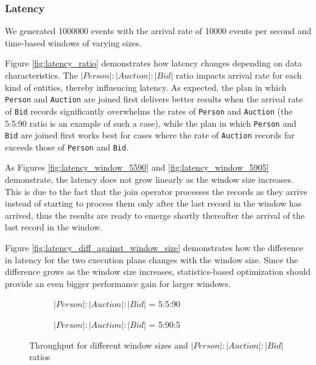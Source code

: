 \subsubsection{Latency}

We generated 1000000 events with the arrival rate of 10000 events per second and time-based windows of varying sizes.

Figure \ref{fig:latency_ratio} 
demonstrates how latency changes depending on data characteristics. The $|Person|:|Auction|:|Bid|$ ratio impacts arrival rate for each kind of entities, thereby influencing latency. As expected, the plan in which \texttt{Person} and \texttt{Auction} are joined first delivers better results when the arrival rate of \texttt{Bid} records significantly overwhelms the rates of \texttt{Person} and \texttt{Auction} (the 5:5:90 ratio is an example of such a case), while the plan in which \texttt{Person} and \texttt{Bid} are joined first works best for cases where the rate of \texttt{Auction} records far exceeds those of \texttt{Person} and \texttt{Bid}. 

As Figures \ref{fig:latency_window_5590} and \ref{fig:latency_window_5905} demonstrate, the latency does not grow linearly as the window size increases. This is due to the fact that the join operator processes the records as they arrive instead of starting to process them only after the last record in the window has arrived, thus the results are ready to emerge shortly thereafter the arrival of the last record in the window.

Figure \ref{fig:latency_diff_against_window_size} demonstrates how the difference in latency for the two execution plans changes with the window size. Since the difference grows as the window size increases, statistics-based optimization should provide an even bigger performance gain for larger windows.

\begin{figure}[!ht]
    \centering
    \begin{subfigure}[b]{0.45\textwidth}
            
            \captionsetup{justification=justified}
            \caption{$|Person|:|Auction|:|Bid|$ = 5:5:90}
            \label{fig:throughput_window_5590}
    \end{subfigure}
    \hspace{1.25mm}
    \begin{subfigure}[b]{0.45\textwidth}
            
            \captionsetup{justification=justified}
            \caption{$|Person|:|Auction|:|Bid|$ = 5:90:5}
            \label{fig:throughput_window_5905}
    \end{subfigure}
    \caption{Throughput for different window sizes and $|Person|:|Auction|:|Bid|$ ratios}
    \label{fig:throughput_plots}
\end{figure}

